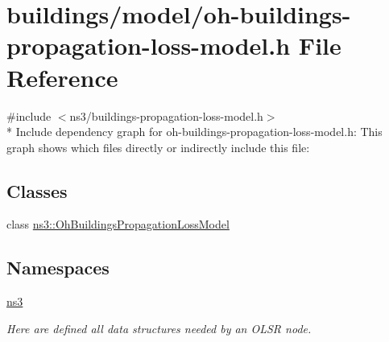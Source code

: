 \hypertarget{oh-buildings-propagation-loss-model_8h}{}\section{buildings/model/oh-\/buildings-\/propagation-\/loss-\/model.h File Reference}
\label{oh-buildings-propagation-loss-model_8h}
{\ttfamily \#include $<$ns3/buildings-\/propagation-\/loss-\/model.\+h$>$}\\*
Include dependency graph for oh-\/buildings-\/propagation-\/loss-\/model.h\+:
This graph shows which files directly or indirectly include this file\+:
\subsection*{Classes}
\begin{DoxyCompactItemize}
\item 
class \hyperlink{classns3_1_1OhBuildingsPropagationLossModel}{ns3\+::\+Oh\+Buildings\+Propagation\+Loss\+Model}
\end{DoxyCompactItemize}
\subsection*{Namespaces}
\begin{DoxyCompactItemize}
\item 
 \hyperlink{namespacens3}{ns3}
\begin{DoxyCompactList}\small\item\em Here are defined all data structures needed by an O\+L\+SR node. \end{DoxyCompactList}\end{DoxyCompactItemize}
